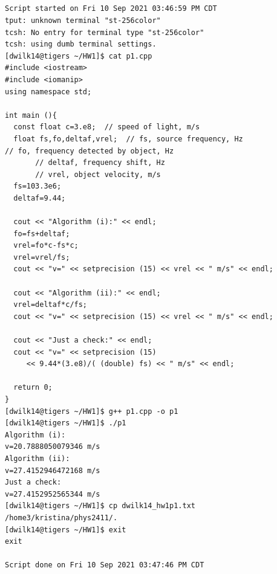 \documentclass{article}
\begin{document}
\subsection{}
\begin{verbatim}
Script started on Fri 10 Sep 2021 03:46:59 PM CDT
tput: unknown terminal "st-256color"
tcsh: No entry for terminal type "st-256color"
tcsh: using dumb terminal settings.
[dwilk14@tigers ~/HW1]$ cat p1.cpp
#include <iostream>
#include <iomanip>
using namespace std;

int main (){
  const float c=3.e8;  // speed of light, m/s
  float fs,fo,deltaf,vrel;  // fs, source frequency, Hz        
// fo, frequency detected by object, Hz
       // deltaf, frequency shift, Hz
       // vrel, object velocity, m/s
  fs=103.3e6;
  deltaf=9.44;

  cout << "Algorithm (i):" << endl;
  fo=fs+deltaf;
  vrel=fo*c-fs*c;
  vrel=vrel/fs;
  cout << "v=" << setprecision (15) << vrel << " m/s" << endl;

  cout << "Algorithm (ii):" << endl;
  vrel=deltaf*c/fs;
  cout << "v=" << setprecision (15) << vrel << " m/s" << endl;

  cout << "Just a check:" << endl;
  cout << "v=" << setprecision (15)
     << 9.44*(3.e8)/( (double) fs) << " m/s" << endl;

  return 0;
}
[dwilk14@tigers ~/HW1]$ g++ p1.cpp -o p1
[dwilk14@tigers ~/HW1]$ ./p1
Algorithm (i):
v=20.7888050079346 m/s
Algorithm (ii):
v=27.4152946472168 m/s
Just a check:
v=27.4152952565344 m/s
[dwilk14@tigers ~/HW1]$ cp dwilk14_hw1p1.txt /home3/kristina/phys2411/.
[dwilk14@tigers ~/HW1]$ exit
exit

Script done on Fri 10 Sep 2021 03:47:46 PM CDT
\end{verbatim}
\end{document}
